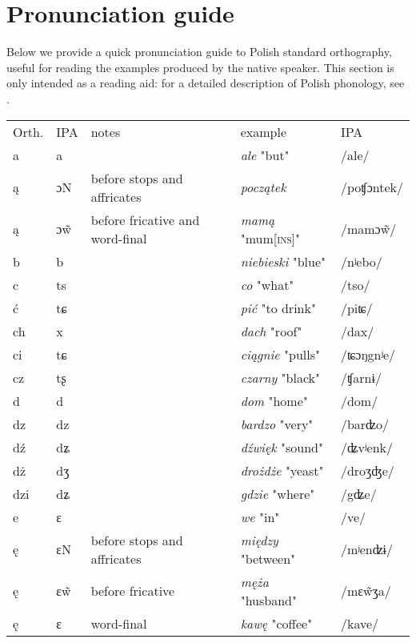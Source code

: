 \chapter{Pronunciation guide}

Below we provide a quick pronunciation guide to Polish standard orthography, useful for reading the examples produced by the native speaker. This section is only intended as a reading aid: for a detailed description of Polish phonology, see \citet{Gussman2007}.

\begin{table}
    \begin{tabular}{lllll}
        \lsptoprule
        Orth. & IPA & notes & example & IPA\\
        a & a &  & \textit{ale} "but" & /ale/\\
        ą & ɔN\footnotemark{} & before stops  and affricates & \textit{początek} & /poʧɔntek/\\
        ą & ɔ\~{w} & before fricative and word-final & \textit{mamą} "mum\textsc{[ins]}" & /mamɔ\~{w}/\\
        b & b &  & \textit{niebieski} "blue" & /nʲebo/\\
        c & ts &  & \textit{co} "what" & /tso/\\
        ć & tɕ &  & \textit{pić} "to drink" & /piʨ/\\
        ch & x &  & \textit{dach} "roof" & /dax/\\
        ci & tɕ &  & \textit{ciągnie} "pulls" & /ʨɔŋgnʲe/\\
        cz & tʂ &  & \textit{czarny} "black" & /ʧarnɨ/\\
        d & d &  & \textit{dom} "home" & /dom/\\
        dz & dz &  & \textit{bardzo} "very" & /barʣo/\\
        dź & dʑ &  & \textit{dźwięk} "sound" & /ʥvʲenk/\\
        dż & dʒ &  & \textit{drożdże} "yeast" & /droʒʤe/\\
        dzi & dʑ &  & \textit{gdzie} "where" & /gʥe/\\
        e & ɛ &  & \textit{we} "in" & /ve/\\
        ę & ɛN & before stops and affricates & \textit{między} "between" & /mʲenʣɨ/\\
        ę & ɛ\~{w} & before fricative & \textit{męża} "husband" & /mɛ\~{w}ʒa/\\
        ę & ɛ & word-final & \textit{kawę} "coffee" & /kave/\\

\end{tabular}
\end{table}
